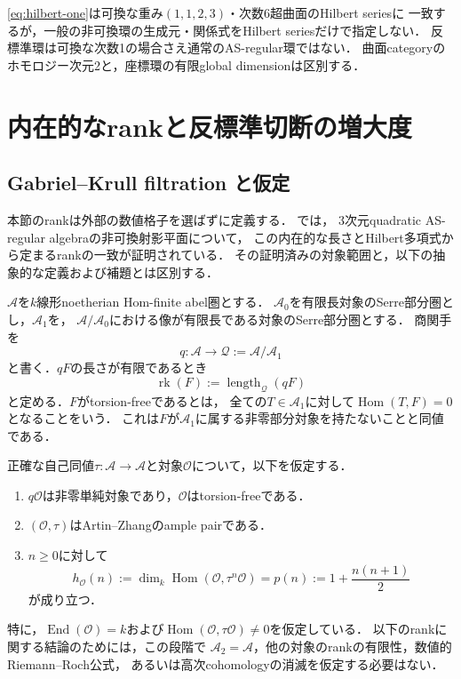 \documentclass[11pt,a4paper]{ltjsarticle}
\theoremstyle{definition}
\newcommand{\OO}{\mathcal O}
\renewcommand{\AA}{\mathcal A}
\newcommand{\Hom}{\operatorname{Hom}}
\newcommand{\End}{\operatorname{End}}
\newcommand{\rk}{\operatorname{rk}}
\begin{document}
\eqref{eq:hilbert-one}は可換な重み$(1,1,2,3)$・次数6超曲面のHilbert seriesに
一致するが，一般の非可換環の生成元・関係式をHilbert seriesだけで指定しない．
反標準環は可換な次数1の場合さえ通常のAS-regular環ではない．
曲面categoryのホモロジー次元2と，座標環の有限global dimensionは区別する．

\section{内在的なrankと反標準切断の増大度}\label{sec:intrinsic-rank}

\subsection{Gabriel--Krull filtration と仮定}
本節のrankは外部の数値格子を選ばずに定義する．
\cite[Definitions A.3--A.4, Proposition A.6]{AOUCompact}では，
3次元quadratic AS-regular algebraの非可換射影平面について，
この内在的な長さとHilbert多項式から定まるrankの一致が証明されている．
その証明済みの対象範囲と，以下の抽象的な定義および補題とは区別する．

$\AA$を$k$線形noetherian Hom-finite abel圏とする．
$\AA_0$を有限長対象のSerre部分圏とし，$\AA_1$を，
$\AA/\AA_0$における像が有限長である対象のSerre部分圏とする．
商関手を
\[
 q:\AA\longrightarrow\mathcal Q:=\AA/\AA_1
\]
と書く．$qF$の長さが有限であるとき
\[
 \rk(F):=\operatorname{length}_{\mathcal Q}(qF)
\]
と定める．$F$がtorsion-freeであるとは，
全ての$T\in\AA_1$に対して$\Hom(T,F)=0$となることをいう．
これは$F$が$\AA_1$に属する非零部分対象を持たないことと同値である．

正確な自己同値$\tau:\AA\to\AA$と対象$\OO$について，以下を仮定する．
\begin{enumerate}
 \item $q\OO$は非零単純対象であり，$\OO$はtorsion-freeである．
 \item $(\OO,\tau)$はArtin--Zhangのample pairである．
 \item $n\geq0$に対して
 \begin{equation}\label{eq:rank-hilbert-input}
 h_{\OO}(n):=\dim_k\Hom(\OO,\tau^n\OO)
   =p(n):=1+\frac{n(n+1)}2
 \end{equation}
 が成り立つ．
\end{enumerate}
特に，$\End(\OO)=k$および$\Hom(\OO,\tau\OO)\ne0$を仮定している．
以下のrankに関する結論のためには，この段階で
$\AA_2=\AA$，他の対象のrankの有限性，数値的Riemann--Roch公式，
あるいは高次cohomologyの消滅を仮定する必要はない．
\end{document}
